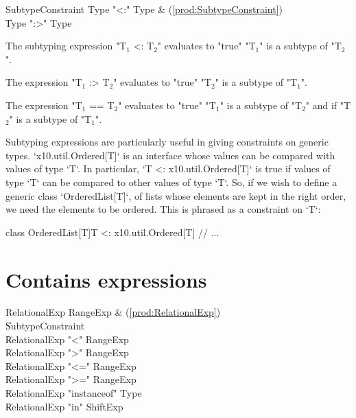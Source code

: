 \begin{bbgrammar}
   SubtypeConstraint \: Type  \xcd"<:" Type  & (\ref{prod:SubtypeConstraint}) \\
                    \| Type  \xcd":>" Type  \\
\end{bbgrammar}

The subtyping expression \xcdmath"T$_1$ <: T$_2$" evaluates to \xcd"true"
\xcdmath"T$_1$" is a subtype of \xcdmath"T$_2$".

The expression \xcdmath"T$_1$ :> T$_2$" evaluates to \xcd"true"
\xcdmath"T$_2$" is a subtype of \xcdmath"T$_1$".

The expression \xcdmath"T$_1$ == T$_2$"
evaluates to  \xcd"true" \xcdmath"T$_1$" is a subtype of \xcdmath"T$_2$" and
if \xcdmath"T$_2$" is a subtype of \xcdmath"T$_1$".

Subtyping expressions are particularly useful in giving constraints on generic
types.  \xcd`x10.util.Ordered[T]` is an interface whose values can be compared
with values of type \xcd`T`. 
In particular, \xcd`T <: x10.util.Ordered[T]` is
true if values of type \xcd`T` can be compared to other values of type
\xcd`T`.  So, if we wish to define a generic class \xcd`OrderedList[T]`, of
lists whose elements are kept in the right order, we need the elements to be
ordered.  This is phrased as a constraint on \xcd`T`: 
\begin{xten}
class OrderedList[T]{T <: x10.util.Ordered[T]} {
  // ...
}
\end{xten}
%




\section{Contains expressions}

\begin{bbgrammar}
       RelationalExp \: RangeExp & (\ref{prod:RelationalExp}) \\
                    \| SubtypeConstraint \\
                    \| RelationalExp \xcd"<" RangeExp \\
                    \| RelationalExp \xcd">" RangeExp \\
                    \| RelationalExp \xcd"<=" RangeExp \\
                    \| RelationalExp \xcd">=" RangeExp \\
                    \| RelationalExp \xcd"instanceof" Type \\
                    \| RelationalExp \xcd"in" ShiftExp \\
\end{bbgrammar}

